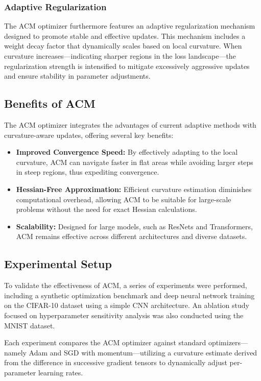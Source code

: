 \documentclass{article} %
\begin{document}
\subsubsection{Adaptive Regularization}
The ACM optimizer furthermore features an adaptive regularization mechanism designed to promote stable and effective updates. This mechanism includes a weight decay factor that dynamically scales based on local curvature. When curvature increases—indicating sharper regions in the loss landscape—the regularization strength is intensified to mitigate excessively aggressive updates and ensure stability in parameter adjustments.

\subsection{Benefits of ACM}
The ACM optimizer integrates the advantages of current adaptive methods with curvature-aware updates, offering several key benefits:
\begin{itemize}
    \item \textbf{Improved Convergence Speed:} By effectively adapting to the local curvature, ACM can navigate faster in flat areas while avoiding larger steps in steep regions, thus expediting convergence.
    \item \textbf{Hessian-Free Approximation:} Efficient curvature estimation diminishes computational overhead, allowing ACM to be suitable for large-scale problems without the need for exact Hessian calculations.
    \item \textbf{Scalability:} Designed for large models, such as ResNets and Transformers, ACM remains effective across different architectures and diverse datasets.
\end{itemize}

\subsection{Experimental Setup}
To validate the effectiveness of ACM, a series of experiments were performed, including a synthetic optimization benchmark and deep neural network training on the CIFAR-10 dataset using a simple CNN architecture. An ablation study focused on hyperparameter sensitivity analysis was also conducted using the MNIST dataset.

Each experiment compares the ACM optimizer against standard optimizers—namely Adam and SGD with momentum—utilizing a curvature estimate derived from the difference in successive gradient tensors to dynamically adjust per-parameter learning rates. 
\end{document}
